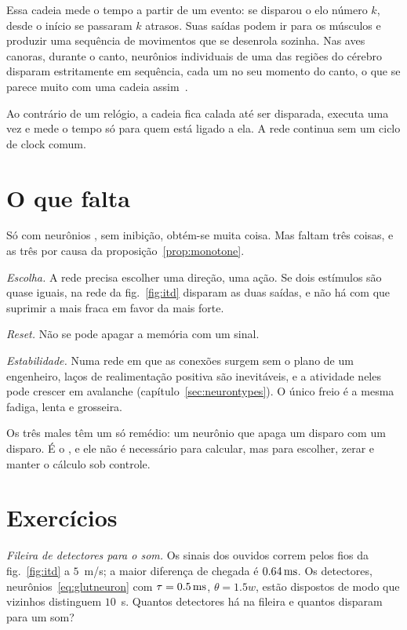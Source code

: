Essa cadeia mede o tempo a partir de um evento: se disparou o elo número $k$, desde o início se passaram $k$ atrasos. Suas saídas podem ir para os músculos e produzir uma sequência de movimentos que se desenrola sozinha. Nas aves canoras, durante o canto, neurônios  individuais de uma das regiões do cérebro disparam estritamente em sequência, cada um no seu momento do canto, o que se parece muito com uma cadeia assim~\cite{Hahnloser2002}.

Ao contrário de um relógio, a cadeia fica calada até ser disparada, executa uma vez e mede o tempo só para quem está ligado a ela. A rede continua sem um ciclo de clock comum.

\section{O que falta}

Só com neurônios , sem inibição, obtém-se muita coisa. Mas faltam três coisas, e as três por causa da proposição~\ref{prop:monotone}.

\emph{Escolha.} A rede precisa escolher uma direção, uma ação. Se dois estímulos são quase iguais, na rede da fig.~\ref{fig:itd} disparam as duas saídas, e não há com que suprimir a mais fraca em favor da mais forte.

\emph{Reset.} Não se pode apagar a memória com um sinal.

\emph{Estabilidade.} Numa rede em que as conexões surgem sem o plano de um engenheiro, laços de realimentação positiva são inevitáveis, e a atividade neles pode crescer em avalanche (capítulo~\ref{sec:neurontypes}). O único freio é a mesma fadiga, lenta e grosseira.

Os três males têm um só remédio: um neurônio que apaga um disparo com um disparo. É o , e ele não é necessário para calcular, mas para escolher, zerar e manter o cálculo sob controle.

\section{Exercícios}

\begin{exercise}[\lvlA]
\label{ex:02:1}
\emph{Fileira de detectores para o som.} Os sinais dos ouvidos correm pelos fios da fig.~\ref{fig:itd} a $5$~m/s; a maior diferença de chegada é $0.64\,\text{ms}$. Os detectores, neurônios~\eqref{eq:glutneuron} com $\tau=0.5\,\text{ms}$, $\theta=1.5w$, estão dispostos de modo que vizinhos distinguem $10$~\textmu s. Quantos detectores há na fileira e quantos disparam para um som?
\end{exercise}


